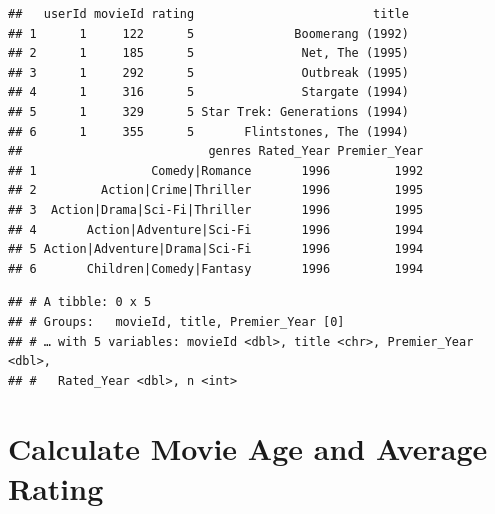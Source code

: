 \documentclass[
]{article}
\newenvironment{Shaded}{\begin{snugshade}}{\end{snugshade}}
\newcommand{\DataTypeTok}[1]{\textcolor[rgb]{0.13,0.29,0.53}{#1}}
\newcommand{\DecValTok}[1]{\textcolor[rgb]{0.00,0.00,0.81}{#1}}
\newcommand{\KeywordTok}[1]{\textcolor[rgb]{0.13,0.29,0.53}{\textbf{#1}}}
\newcommand{\NormalTok}[1]{#1}
\newcommand{\OperatorTok}[1]{\textcolor[rgb]{0.81,0.36,0.00}{\textbf{#1}}}
\newcommand{\StringTok}[1]{\textcolor[rgb]{0.31,0.60,0.02}{#1}}
\begin{document}
\begin{verbatim}
##   userId movieId rating                         title
## 1      1     122      5              Boomerang (1992)
## 2      1     185      5               Net, The (1995)
## 3      1     292      5               Outbreak (1995)
## 4      1     316      5               Stargate (1994)
## 5      1     329      5 Star Trek: Generations (1994)
## 6      1     355      5       Flintstones, The (1994)
##                          genres Rated_Year Premier_Year
## 1                Comedy|Romance       1996         1992
## 2         Action|Crime|Thriller       1996         1995
## 3  Action|Drama|Sci-Fi|Thriller       1996         1995
## 4       Action|Adventure|Sci-Fi       1996         1994
## 5 Action|Adventure|Drama|Sci-Fi       1996         1994
## 6       Children|Comedy|Fantasy       1996         1994
\end{verbatim}

\begin{Shaded}
\end{Shaded}

\begin{verbatim}
## # A tibble: 0 x 5
## # Groups:   movieId, title, Premier_Year [0]
## # … with 5 variables: movieId <dbl>, title <chr>, Premier_Year <dbl>,
## #   Rated_Year <dbl>, n <int>
\end{verbatim}

\hypertarget{calculate-movie-age-and-average-rating}{%
\section{Calculate Movie Age and Average
Rating}\label{calculate-movie-age-and-average-rating}}

\begin{Shaded}
\end{Shaded}
\end{document}
